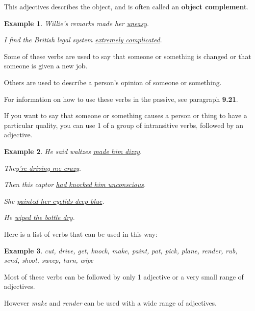 \documentclass[oneside]{book}
\numberwithin{equation}{section}
\newtheorem{example}{Example}[section]
\begin{document}
This adjectives describes the object, and is often called an \textbf{object complement}.
\begin{example}
    Willie's remarks made her \underline{uneasy}.
    
    I find the British legal system \underline{extremely complicated}.
\end{example}
Some of these verbs are used to say that someone or something is changed or that someone is given a new job.

Others are used to describe a person's opinion of someone or something.

%
For information on how to use these verbs in the passive, see paragraph \textbf{9.21}.

%
\noindent{} If you want to say that someone or something causes a person or thing to have a particular quality, you can use 1 of a group of intransitive verbs, followed by an adjective.
\begin{example}
    He said waltzes \underline{made him dizzy}.
    
    They\underline{'re driving me crazy}.
    
    Then this captor \underline{had knocked him unconscious}.
    
    She \underline{painted her eyelids deep blue}.
    
    He \underline{wiped the bottle dry}.
\end{example}
Here is a list of verbs that can be used in this way:
\begin{example}
    cut, drive, get, knock, make, paint, pat, pick, plane, render, rub, send, shoot, sweep, turn, wipe
\end{example}
Most of these verbs can be followed by only 1 adjective or a very small range of adjectives.

However \textit{make} and \textit{render} can be used with a wide range of adjectives.
\end{document}
